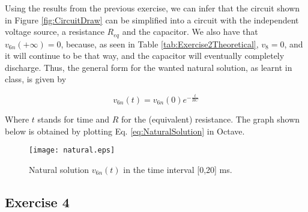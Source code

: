 Using the results from the previous exercise, we can infer that the circuit shown in Figure \ref{fig:CircuitDraw} can be simplified into a circuit with the independent voltage source, a resistance $R_{eq}$ and the capacitor. We also have that $v_{6n}(+\infty)=0$, because, as seen in Table \ref{tab:Exercise2Theoretical}, $v_8=0$, and it will continue to be that way, and the capacitor will eventually completely discharge. Thus, the general form for the wanted natural solution, as learnt in class, is given by

\begin{equation} \label{eq:NaturalSolution}
  v_{6n}(t)=v_{6n}(0)e^{-\frac{t}{RC}}
\end{equation}

Where $t$ stands for time and $R$ for the (equivalent) resistance. The graph shown below is obtained by plotting Eq. \ref{eq:NaturalSolution} in Octave.

\begin{figure}[H]
  \centering
  \texttt{[image: natural.eps]}
  \caption{Natural solution $v_{6n}(t)$ in the time interval [0,20] ms.}
  \label{fig:NaturalSolutionGraph}
\end{figure}


\subsection{Exercise 4} \label{sec:Ex4Theo}


